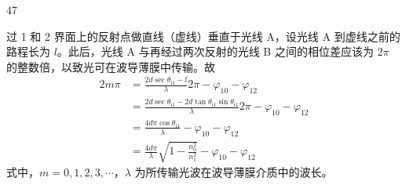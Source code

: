 \begin{solution}{47}
\begin{subsolution}
        过 1 和 2 界面上的反射点做直线（虚线）垂直于光线 A，设光线 A 到虚线之前的路程长为 $l$。此后，光线 A 与再经过两次反射的光线 B 之间的相位差应该为 $2\pi$ 的整数倍，以致光可在波导薄膜中传输。故
        \begin{equation}
            \begin{aligned}
                2m\pi &= \frac{2d\sec\theta_{\mathrm{i}1} - l}{\lambda}2\pi - \varphi_{10} - \varphi_{12} \\
                &= \frac{2d\sec\theta_{\mathrm{i}1} - 2d\tan\theta_{\mathrm{i}1}\sin\theta_{\mathrm{i}1}}{\lambda}2\pi - \varphi_{10} - \varphi_{12} \\
                &= \frac{4d\pi\cos\theta_{\mathrm{i}1}}{\lambda} - \varphi_{10} - \varphi_{12} \\
                &= \frac{4d\pi}{\lambda}\sqrt{1 - \frac{n_{0}^{2}}{n_{1}^{2}}} - \varphi_{10} - \varphi_{12}
            \end{aligned}
            \label{eq:7.s47}
        \end{equation}
        式中，$m = 0, 1, 2, 3, \cdots$，$\lambda$ 为所传输光波在波导薄膜介质中的波长。


\end{subsolution}
\end{solution}
